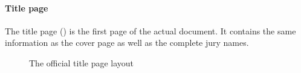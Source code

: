 \documentclass[11pt,article,oneside,a4paper]{memoir}
\begin{document}
\paragraph{Title page} The title page () is the first
page of the actual document. It contains the same information as the cover
page as well as the complete jury names.
\begin{figure}
  \centering \fboxsep=0pt
  \caption{The official title page layout}
  \label{fig:titlepage}
\end{figure}
\end{document}
